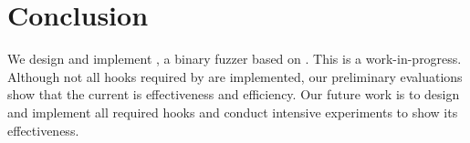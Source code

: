 
\section{Conclusion}
\label{sec:conclusion}

We design and implement \sys, a binary fuzzer based on \libfuzzer.
This is a work-in-progress.
Although not all hooks required by \libfuzzer are implemented, our preliminary evaluations show that the current \sys is effectiveness and efficiency.
Our future work is to design and implement all \libfuzzer required hooks and conduct intensive experiments to show its effectiveness.

